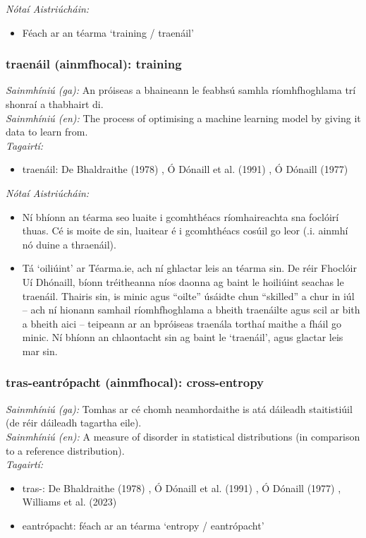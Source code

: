  \noindent \textit{Nótaí Aistriúcháin:}
\begin{itemize}
	\item Féach ar an téarma `training / traenáil'
\end{itemize}


\subsubsection*{traenáil (ainmfhocal): training}
 \noindent \textit{Sainmhíniú (ga):} An próiseas a bhaineann le feabhsú samhla ríomhfhoghlama trí shonraí a thabhairt di.
\\
 \noindent \textit{Sainmhíniú (en):} The process of optimising a machine learning model by giving it data to learn from.
\\
 \noindent \textit{Tagairtí:}
\begin{itemize}
	\item traenáil: De Bhaldraithe (1978) \cite{de-bhaldraithe}, Ó Dónaill et al. (1991) \cite{focloir-beag}, Ó Dónaill (1977) \cite{odonaill}
\end{itemize}

 \noindent \textit{Nótaí Aistriúcháin:}
\begin{itemize}
	\item Ní bhíonn an téarma seo luaite i gcomhthéacs ríomhaireachta sna foclóirí thuas. Cé is moite de sin, luaitear é i gcomhthéacs cosúil go leor (.i. ainmhí nó duine a thraenáil).
	\item Tá `oiliúint' ar Téarma.ie, ach ní ghlactar leis an téarma sin. De réir Fhoclóir Uí Dhónaill, bíonn tréitheanna níos daonna ag baint le hoiliúint seachas le traenáil. Thairis sin, is minic agus “oilte” úsáidte chun “skilled” a chur in iúl -- ach ní hionann samhail ríomhfhoghlama a bheith traenáilte agus scil ar bith a bheith aici -- teipeann ar an bpróiseas traenála torthaí maithe a fháil go minic. Ní bhíonn an chlaontacht sin ag baint le `traenáil', agus glactar leis mar sin.
\end{itemize}


\subsubsection*{tras-eantrópacht (ainmfhocal): cross-entropy}
 \noindent \textit{Sainmhíniú (ga):} Tomhas ar cé chomh neamhordaithe is atá dáileadh staitistiúil (de réir dáileadh tagartha eile).
\\
 \noindent \textit{Sainmhíniú (en):} A measure of disorder in statistical distributions (in comparison to a reference distribution).
\\
 \noindent \textit{Tagairtí:}
\begin{itemize}
	\item tras-: De Bhaldraithe (1978) \cite{de-bhaldraithe}, Ó Dónaill et al. (1991) \cite{focloir-beag}, Ó Dónaill (1977) \cite{odonaill}, Williams et al. (2023) \cite{storchiste}
	\item eantrópacht: féach ar an téarma `entropy / eantrópacht'
\end{itemize}

